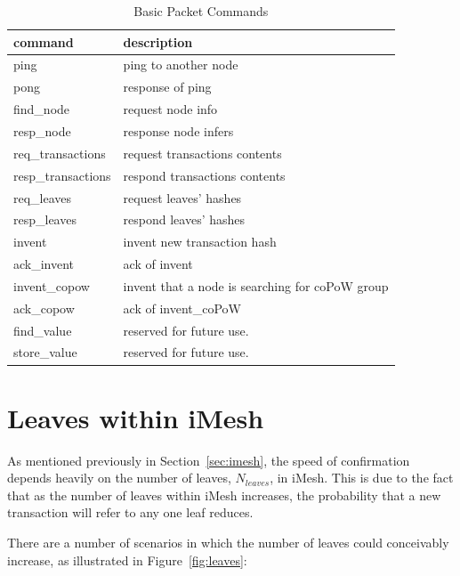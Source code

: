 \documentclass[a4paper,10pt,twocolumn]{article}
\begin{document}
	\newpage
	
	
	 \begin{table}[htb]
		\caption{Basic Packet Commands}
		\label{tbl:cmd}
		\begin{tabularx}{\linewidth}{XX} 
			command & description \\
			\toprule
	  ping & ping to another node \\
	  pong & response of ping \\
	  find\_node & request node info\\
		resp\_node & response node infers \\
	  req\_transactions & request transactions contents \\
	  resp\_transactions & respond transactions contents \\
	  req\_leaves & request  leaves' hashes \\
	  resp\_leaves &  respond leaves' hashes \\
	  invent &  invent new transaction hash \\
	  ack\_invent & ack of invent \\
	  invent\_copow & invent that a node is searching for coPoW group \\
	  ack\_copow & ack of invent\_coPoW \\
	  find\_value &  reserved for future use.\\
	  store\_value & reserved for future use.\\
	  \bottomrule
	\end{tabularx}
	  \end{table}
	
	\section{Leaves within iMesh}
	\label{sec:leaves}
	
	As mentioned previously in Section~\ref{sec:imesh}, the speed of confirmation
	depends heavily on the number of leaves, \( N_{leaves} \), in iMesh. This is due to the fact that as the number of leaves within iMesh increases,
	the probability that a new transaction will refer to any one leaf reduces. 
	
	\vspace{2.5mm}
	
	There are a number of scenarios in which the number of leaves could conceivably increase, as illustrated in Figure~\ref{fig:leaves}:
	
\end{document}
